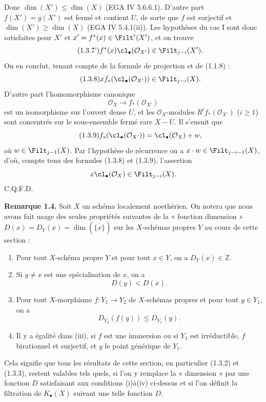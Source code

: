 Donc $\dim(X')\leq\dim(X)$ (EGA IV 5.6.6.1). D'autre part $f(X')=g(X')$ est fermé et contient $U$, de sorte que $f$ est surjectif et $\dim(X')\geq\dim(X)$ (EGA IV 5.4.1(ii)). Les hypothèses du cas I sont donc satisfaites pour $X'$ et $x'=f^*(x)\in\Filt^i(X')$, et on trouve
\begin{equation}\tag{1.3.7'}
f^*(x)\cl_\bullet(\mathcal O_{X'})\in\Filt_{j-i}(X').
\end{equation}
On en conclut, tenant compte de la formule de projection et de (1.1.8) :
\begin{equation}\tag{1.3.8}
x f_*(\cl_\bullet(\mathcal O_{X'}))\in\Filt_{j-i}(X).
\end{equation}
D'autre part l'homomorphisme canonique
\[
\mathcal O_X\longrightarrow f_*(\mathcal O_{X'})
\]
est un isomorphisme sur l'ouvert dense $U$, et les $\mathcal O_X$-modules $R^if_*(\mathcal O_{X'})$ ($i\geq1$) sont concentrés sur le sous-ensemble fermé rare $X-U$. Il s'ensuit que
\begin{equation}\tag{1.3.9}
f_*(\cl_\bullet(\mathcal O_{X'}))=\cl_\bullet(\mathcal O_X)+w,
\end{equation}
où $w\in\Filt_{j-1}(X)$. Par l'hypothèse de récurrence on a $x\cdot w\in\Filt_{j-i-1}(X)$, d'où, compte tenu des formules (1.3.8) et (1.3.9), l'assertion
\[
x\cl_\bullet(\mathcal O_X)\in\Filt_{j-i}(X).
\]
C.Q.F.D.

\textbf{Remarque 1.4.} Soit $X$ un schéma localement noethérien. On notera que nous avons fait usage des seules propriétés suivantes de la « fonction dimension » $D(x)=D_Y(x)=\dim(\overline{\{x\}})$ sur les $X$-schémas propres $Y$ au cours de cette section :
\begin{enumerate}[label=(\roman*)]
\item Pour tout $X$-schéma propre $Y$ et pour tout $x\in Y$, on a $D_Y(x)\in\mathbb Z$.
\item Si $y\ne x$ est une spécialisation de $x$, on a
\[
D(y)<D(x).
\]
\item Pour tout $X$-morphisme $f:Y_1\to Y_2$ de $X$-schémas propres et pour tout $y\in Y_1$, on a
\[
D_{Y_2}(f(y))\leq D_{Y_1}(y).
\]
\item Il y a égalité dans (iii), si $f$ est une immersion ou si $Y_1$ est irréductible, $f$ birationnel et surjectif, et $y$ le point générique de $Y_1$.
\end{enumerate}
Cela signifie que tous les résultats de cette section, en particulier (1.3.2) et (1.3.3), restent valables tels quels, si l'on y remplace la « dimension » par une fonction $D$ satisfaisant aux conditions (i)à(iv) ci-dessus et si l'on définit la filtration de $K_\bullet(X)$ suivant une telle fonction $D$.

